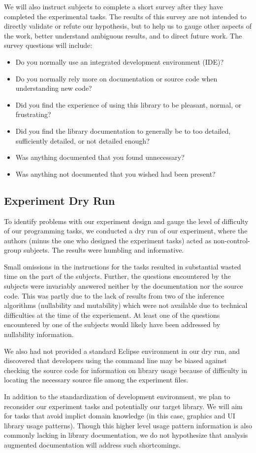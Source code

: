 We will also instruct subjects to complete a short survey after they have
completed the experimental tasks. The results of this survey are not intended
to directly validate or refute our hypothesis, but to help us to gauge other
aspects of the work, better understand ambiguous results, and to direct future
work. The survey questions will include:

\begin{itemize}
\item Do you normally use an integrated development environment (IDE)?
\item Do you normally rely more on documentation or source code when
  understanding new code?
\item Did you find the experience of using this library to be pleasant, normal,
  or frustrating?
\item Did you find the library documentation to generally be to too detailed,
  sufficiently detailed, or not detailed enough?
\item Was anything documented that you found unnecessary?
\item Was anything not documented that you wished had been present?
\end{itemize}

\subsection{Experiment Dry Run}

To identify problems with our experiment design and gauge the level of
difficulty of our programming tasks, we conducted a dry run of our experiment,
where the authors (minus the one who designed the experiment tasks) acted as
non-control-group subjects. The results were humbling and informative.

Small omissions in the instructions for the tasks resulted in substantial
wasted time on the part of the subjects. Further, the questions encountered by
the subjects were invariably answered neither by the documentation nor the
source code. This was partly due to the lack of results from two of the
inference algorithms (nullability and mutability) which were not available due
to technical difficulties at the time of the experiement. At least one of the
questions encountered by one of the subjects would likely have been addressed
by nullability information.

We also had not provided a standard Eclipse environment in our dry run, and
discovered that developers using the command line may be biased against
checking the source code for information on library usage because of difficulty
in locating the necessary source file among the experiment files.

In addition to the standardization of development environment, we plan to
reconsider our experiment tasks and potentially our target library. We will aim
for tasks that avoid implict domain knowledge (in this case, graphics and UI
library usage patterns). Though this higher level usage pattern information is
also commonly lacking in library documentation, we do not hypothesize that
analysis augmented documentation will address such shortcomings.

